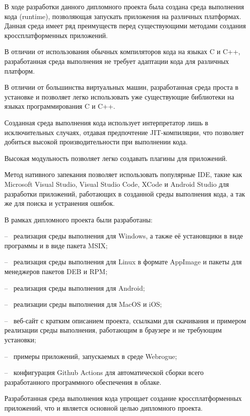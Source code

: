В ходе разработки данного дипломного проекта была создана среда выполнения кода (runtime), позволяющая запускать приложения на различных платформах.
Данная среда имеет ряд преимуществ перед существующими методами создания кроссплатформенных приложений.

В отличии от использования обычных компиляторов кода на языках C и C++, разработанная среда выполнения не требует адаптации кода для различных платформ. 

В отличии от большинства виртуальных машин, разработанная среда проста в установке и позволяет легко использовать уже существующие библиотеки на языках программирования C и C++.

Созданная среда выполнения кода использует интерпретатор лишь в исключительных случаях, отдавая предпочтение JIT-компиляции, что позволяет добиться высокой производительности при выполнении кода.

Высокая модульность позволяет легко создавать плагины для приложений.

Метод нативного запекания позволяет использовать популярные IDE, такие как Microsoft Visual Studio, Visual Studio Code, XCode и Android Studio для разработки приложений, работающих в созданной среды выполнения кода, а так же для поиска и устранения ошибок.

В рамках дипломного проекта были разработаны:

-- ~реализация среды выполнения для Windows, а также её установщики в виде программы и в виде пакета MSIX;

-- ~реализация среды выполнения для Linux в формате AppImage и пакеты для менеджеров пакетов DEB и RPM;

-- ~реализация среды выполнения для Android;

-- ~реализации среды выполнения для MacOS и iOS;

-- ~веб-сайт с кратким описанием проекта, ссылками для скачивания и примером реализации среды выполнения, работающим в браузере и не требующим установки;

-- ~примеры приложений, запускаемых в среде Webrogue;

-- ~конфигурация Github Actions для автоматической сборки всего разработанного программного обеспечения в облаке.

Разработанная среда выполнения кода упрощает создание кроссплатформенных приложений, что и является основной целью дипломного проекта.
